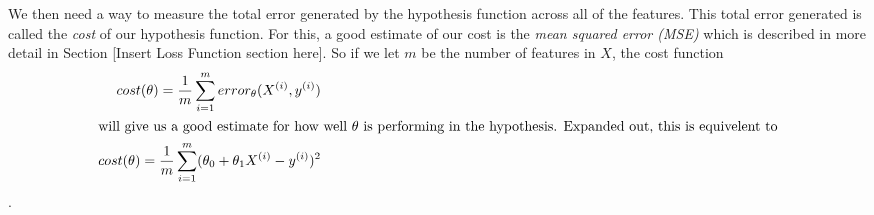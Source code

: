 We then need a way to measure the total error generated by the hypothesis
function across all of the features. This total error generated is called the
\emph{cost} of our hypothesis function. For this, a good estimate of our cost is
the \emph{mean squared error (MSE)} which is described in more detail in Section
[Insert Loss Function section here]. So if we let $m$ be the number of features
in $X$, the cost function
\begin{subequations}
    \begin{align}
        cost(\theta) = \frac{1}{m}\sum_{i=1}^m error_{\theta}(X^{(i)}, y^{(i)}) \\
    \intertext{will give us a good estimate for how well $\theta$ is performing in the hypothesis. Expanded out, this is equivelent to}
        cost(\theta) = \frac{1}{m}\sum_{i=1}^m (\theta_0 + \theta_1X^{(i)} -
        y^{(i)})^2
    \end{align}
\end{subequations}
.

